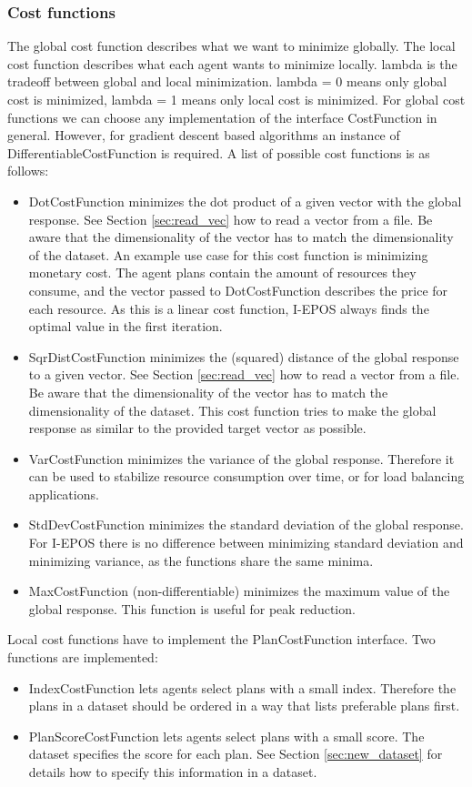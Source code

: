 \documentclass[11pt]{article} %
\newcommand{\code}{}
\begin{document}
\subsubsection*{Cost functions}
The global cost function describes what we want to minimize globally. The local cost function describes what each agent wants to minimize locally. \code{lambda} is the tradeoff between global and local minimization. \code{lambda = 0} means only global cost is minimized, \code{lambda = 1} means only local cost is minimized.
For global cost functions we can choose any implementation of the interface \code{CostFunction} in general. However, for gradient descent based algorithms an instance of \code{DifferentiableCostFunction} is required. A list of possible cost functions is as follows:
\begin{itemize}
	\item \code{DotCostFunction} minimizes the dot product of a given vector with the global response. See Section \ref{sec:read_vec} how to read a vector from a file. Be aware that the dimensionality of the vector has to match the dimensionality of the dataset.
An example use case for this cost function is minimizing monetary cost. The agent plans contain the amount of resources they consume, and the vector passed to \code{DotCostFunction} describes the price for each resource.
As this is a linear cost function, I-EPOS always finds the optimal value in the first iteration.
	\item \code{SqrDistCostFunction} minimizes the (squared) distance of the global response to a given vector. See Section \ref{sec:read_vec} how to read a vector from a file. Be aware that the dimensionality of the vector has to match the dimensionality of the dataset.
This cost function tries to make the global response as similar to the provided target vector as possible.
	\item \code{VarCostFunction} minimizes the variance of the global response. Therefore it can be used to stabilize resource consumption over time, or for load balancing applications.
	\item \code{StdDevCostFunction} minimizes the standard deviation of the global response. For I-EPOS there is no difference between minimizing standard deviation and minimizing variance, as the functions share the same minima.
	\item \code{MaxCostFunction} (non-differentiable) minimizes the maximum value of the global response. This function is useful for peak reduction.
\end{itemize}
Local cost functions have to implement the \code{PlanCostFunction} interface. Two functions are implemented:
\begin{itemize}
	\item \code{IndexCostFunction} lets agents select plans with a small index. Therefore the plans in a dataset should be ordered in a way that lists preferable plans first.
	\item \code{PlanScoreCostFunction} lets agents select plans with a small score. The dataset specifies the score for each plan. See Section \ref{sec:new_dataset} for details how to specify this information in a dataset.
\end{itemize}
\end{document}
